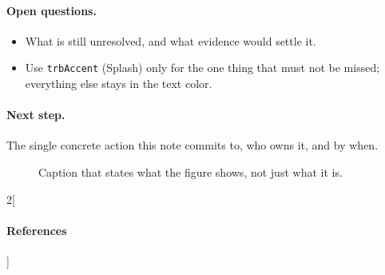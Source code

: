 \documentclass[note,internal]{trbdoc}
\begin{document}
\paragraph{Open questions.}
\begin{itemize}
  \item What is still unresolved, and what evidence would settle it.
  \item Use \textcolor{trbAccent}{\texttt{trbAccent}} (Splash) only for the one thing that
    must not be missed; everything else stays in the text color.
\end{itemize}

\paragraph{Next step.}
The single concrete action this note commits to, who owns it, and by when.

\begin{figure}[htbp]
\centering
{}
\caption{Caption that states what the figure shows, not just what it is.}
\end{figure}

\begingroup
\renewcommand{\bibsection}{}
\setlength{\columnsep}{16pt}
\begin{multicols}{2}[\paragraph{References}]
\raggedright


\end{multicols}
\endgroup
\end{document}
